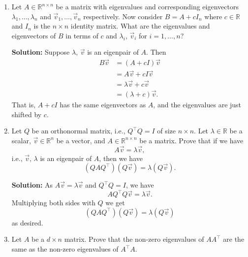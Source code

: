 \documentclass[10pt]{article}
\newcommand{\RR}{\mathbb{R}}
\begin{document}
\begin{enumerate}[label=(\alph*)]
    \item Let $A \in \RR^{n \times n}$ be a matrix with eigenvalues and corresponding eigenvectors $\lambda_1, \ldots, \lambda_n$ and $\vec{v}_1, \ldots, \vec{v}_n$ respectively. Now consider $B = A + cI_n$ where $c \in \RR$ and $I_n$ is the $n \times n$ identity matrix. What are the eigenvalues and eigenvectors of $B$ in terms of $c$ and $\lambda_i$, $\vec{v}_i$ for $i = 1, \ldots, n$?

    \textbf{Solution:} Suppose $\lambda$, $\vec{v}$ is an eigenpair of $A$. Then
    \begin{align}
        B\vec{v} &= (A + cI)\vec{v} \\
        &= A\vec{v} + cI\vec{v} \\
        &= \lambda\vec{v} + c\vec{v} \\
        &= (\lambda + c)\vec{v}.
    \end{align}
    That is, $A + cI$ has the same eigenvectors as $A$, and the eigenvalues are just shifted by $c$.

    \item Let $Q$ be an orthonormal matrix, i.e., $Q^\top Q = I$ of size $n \times n$. Let $\lambda \in \RR$ be a scalar, $\vec{v} \in \RR^n$ be a vector, and $A \in \RR^{n \times n}$ be a matrix. Prove that if we have
    \begin{equation}
        A\vec{v} = \lambda \vec{v},
    \end{equation}
    i.e., $\vec{v}$, $\lambda$ is an eigenpair of $A$, then we have
    \begin{equation}
        (QAQ^\top)(Q\vec{v}) = \lambda(Q\vec{v}).
    \end{equation}

    \textbf{Solution:} As $A\vec{v} = \lambda\vec{v}$ and $Q^\top Q = I$, we have
    \begin{equation}
        AQ^\top Q\vec{v} = \lambda\vec{v}.
    \end{equation}
    Multiplying both sides with $Q$ we get
    \begin{equation}
        (QAQ^\top)(Q\vec{v}) = \lambda(Q\vec{v})
    \end{equation}
    as desired.

    \item Let $A$ be a $d \times n$ matrix. Prove that the non-zero eigenvalues of $AA^\top$ are the same as the non-zero eigenvalues of $A^\top A$.


\end{enumerate}
\end{document}
